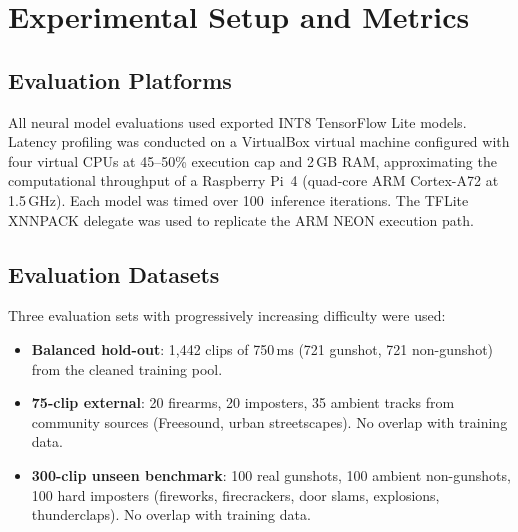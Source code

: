 \documentclass[conference]{IEEEtran}
\begin{document}
\section{Experimental Setup and Metrics}
\label{sec:setup}

\subsection{Evaluation Platforms}
All neural model evaluations used exported INT8 TensorFlow Lite models. Latency profiling was conducted on a VirtualBox virtual machine configured with four virtual CPUs at 45--50\% execution cap and 2\,GB RAM, approximating the computational throughput of a Raspberry Pi~4 (quad-core ARM Cortex-A72 at 1.5\,GHz). Each model was timed over 100~inference iterations. The TFLite XNNPACK delegate was used to replicate the ARM NEON execution path.

\subsection{Evaluation Datasets}
Three evaluation sets with progressively increasing difficulty were used:
\begin{itemize}
    \item \textbf{Balanced hold-out}: 1{,}442 clips of 750\,ms (721 gunshot, 721 non-gunshot) from the cleaned training pool.
    \item \textbf{75-clip external}: 20 firearms, 20 imposters, 35 ambient tracks from community sources (Freesound, urban streetscapes). No overlap with training data.
    \item \textbf{300-clip unseen benchmark}: 100 real gunshots, 100 ambient non-gunshots, 100 hard imposters (fireworks, firecrackers, door slams, explosions, thunderclaps). No overlap with training data.
\end{itemize}
\end{document}
